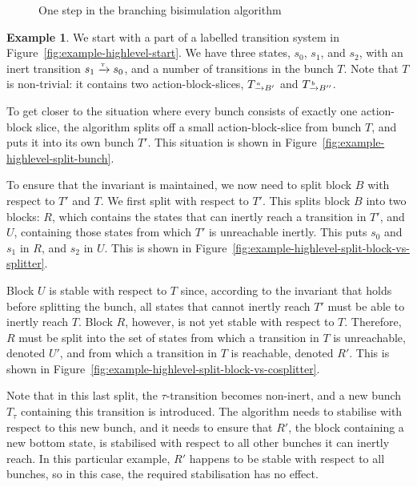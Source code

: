 \documentclass[a4paper,10pt]{article}
\theoremstyle{definition}
\newtheorem{example}[definition]{Example}
\theoremstyle{plain}
\newcommand{\pijl}[1]{\mathrel{\text{$\xrightarrow{\smash[t]{#1}}$}}}
\begin{document}
\begin{figure}[ht]
\begin{subfigure}[t]{.47\linewidth}
	\end{subfigure}

\caption{One step in the branching bisimulation algorithm}\label{fig:example-highlevel}
\end{figure}

\begin{example}
We start with a part of a labelled transition system in Figure~\ref{fig:example-highlevel-start}. We have three states, $s_0$, $s_1$, and $s_2$, with an inert transition $s_1 \pijl{\tau} s_0$, and a number of transitions in the bunch $T$. Note that $T$ is non-trivial: it contains two action-block-slices, $T_{\pijl{a}B'}$ and $T_{\pijl{b}B''}$.

To get closer to the situation where every bunch consists of exactly one action-block slice, the algorithm splits off a small action-block-slice from bunch $T$, and puts it into its own bunch $T'$. This situation is shown in Figure~\ref{fig:example-highlevel-split-bunch}.

To ensure that the invariant is maintained, we now need to split block $B$ with respect to $T'$ and $T$. We first split with respect to $T'$. This splits block $B$ into two blocks: $R$, which contains the states that can inertly reach a transition in $T'$, and $U$, containing those states from which $T'$ is unreachable inertly. This puts $s_0$ and $s_1$ in $R$, and $s_2$ in $U$. This is shown in Figure~\ref{fig:example-highlevel-split-block-vs-splitter}.

Block $U$ is stable with respect to $T$ since, according to the invariant that holds before splitting the bunch, all states that cannot inertly reach $T'$ must be able to inertly reach $T$.
Block $R$, however, is not yet stable with respect to $T$.
Therefore, $R$ must be split into the set of states from which a transition in $T$ is unreachable, denoted $U'$, and from which a transition in $T$ is reachable, denoted $R'$. This is shown in Figure~\ref{fig:example-highlevel-split-block-vs-cosplitter}.

Note that in this last split, the $\tau$-transition becomes non-inert, and a new bunch $T_\tau$ containing this transition is introduced. The algorithm needs to stabilise with respect to this new bunch, and it needs to ensure that $R'$, the block containing a new bottom state, is stabilised with respect to all other bunches it can inertly reach. In this particular example, $R'$ happens to be stable with respect to all bunches, so in this case, the required stabilisation has no effect.
\end{example}
\end{document}
